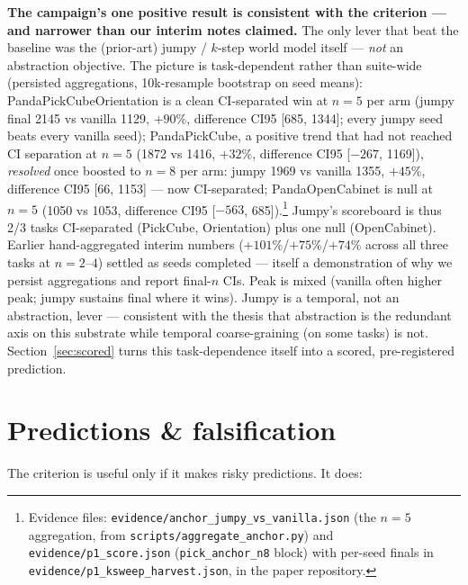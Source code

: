 \documentclass{article}
\begin{document}
\textbf{The campaign's one positive result is consistent with the criterion --- and narrower than our interim notes claimed.} The only lever that beat the baseline was the (prior-art) jumpy / $k$-step world model itself \citep{farebrother2026jumpy} --- \emph{not} an abstraction objective. The picture is task-dependent rather than suite-wide (persisted aggregations, 10k-resample bootstrap on seed means): PandaPickCubeOrientation is a clean CI-separated win at $n{=}5$ per arm (jumpy final 2145 vs vanilla 1129, $+90\%$, difference CI95 [685, 1344]; every jumpy seed beats every vanilla seed); PandaPickCube, a positive trend that had not reached CI separation at $n{=}5$ (1872 vs 1416, $+32\%$, difference CI95 [$-267$, 1169]), \emph{resolved} once boosted to $n{=}8$ per arm: jumpy 1969 vs vanilla 1355, $+45\%$, difference CI95 [66, 1153] --- now CI-separated; PandaOpenCabinet is null at $n{=}5$ (1050 vs 1053, difference CI95 [$-563$, 685]).\footnote{Evidence files: \texttt{evidence/anchor\_jumpy\_vs\_vanilla.json} (the $n{=}5$ aggregation, from \texttt{scripts/aggregate\_anchor.py}) and \texttt{evidence/p1\_score.json} (\texttt{pick\_anchor\_n8} block) with per-seed finals in \texttt{evidence/p1\_ksweep\_harvest.json}, in the paper repository.} Jumpy's scoreboard is thus 2/3 tasks CI-separated (PickCube, Orientation) plus one null (OpenCabinet). Earlier hand-aggregated interim numbers ($+101\%$/$+75\%$/$+74\%$ across all three tasks at $n{=}2$--$4$) settled as seeds completed --- itself a demonstration of why we persist aggregations and report final-$n$ CIs. Peak is mixed (vanilla often higher peak; jumpy sustains final where it wins). Jumpy is a temporal, not an abstraction, lever --- consistent with the thesis that abstraction is the redundant axis on this substrate while temporal coarse-graining (on some tasks) is not. Section~\ref{sec:scored} turns this task-dependence itself into a scored, pre-registered prediction.



\section{Predictions \& falsification}
\label{sec:predictions}

The criterion is useful only if it makes risky predictions. It does:
\end{document}
